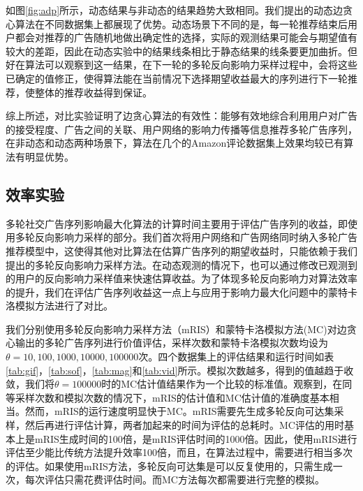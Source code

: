 如图\ref{fig:adp}所示，动态结果与非动态的结果趋势大致相同。我们提出的动态边贪心算法在不同数据集上都展现了优势。动态场景下不同的是，每一轮推荐结束后用户都会对推荐的广告随机地做出确定性的选择，实际的观测结果可能会与期望值有较大的差距，因此在动态实验中的结果线条相比于静态结果的线条要更加曲折。但好在算法可以观察到这一结果，在下一轮的多轮反向影响力采样过程中，会将这些已确定的值修正，使得算法能在当前情况下选择期望收益最大的序列进行下一轮推荐，使整体的推荐收益得到保证。

综上所述，对比实验证明了边贪心算法的有效性：能够有效地综合利用用户对广告的接受程度、广告之间的关联、用户网络的影响力传播等信息推荐多轮广告序列，在非动态和动态两种场景下，算法在几个的Amazon评论数据集上效果均较已有算法有明显优势。

\subsection{效率实验}

多轮社交广告序列影响最大化算法的计算时间主要用于评估广告序列的收益，即使用多轮反向影响力采样的部分。我们首次将用户网络和广告网络同时纳入多轮广告推荐模型中，这使得其他对比算法在估算广告序列的期望收益时，只能依赖于我们提出的多轮反向影响力采样方法。在动态观测的情况下，也可以通过修改已观测到的用户的反向影响力采样值来快速估算收益。为了体现多轮反向影响力对算法效率的提升，我们在评估广告序列收益这一点上与应用于影响力最大化问题中的蒙特卡洛模拟方法\cite{kempe2003maximizing}进行了对比。

我们分别使用多轮反向影响力采样方法（mRIS）和蒙特卡洛模拟方法(MC)对边贪心输出的多轮广告序列进行价值评估，采样次数和蒙特卡洛模拟次数均设为$\theta={10,100,1000,10000,100000}$次。四个数据集上的评估结果和运行时间如表\ref{tab:gif}，\ref{tab:sof}，\ref{tab:mag}和\ref{tab:vid}所示。模拟次数越多，得到的值越趋于收敛，我们将$\theta=100000$时的MC估计值结果作为一个比较的标准值。观察到，在同等采样次数和模拟次数的情况下，mRIS的估计值和MC估计值的准确度基本相当。然而，mRIS的运行速度明显快于MC。mRIS需要先生成多轮反向可达集采样，然后再进行评估计算，两者加起来的时间为评估的总耗时。MC评估的用时基本上是mRIS生成时间的100倍，是mRIS评估时间的1000倍。因此，使用mRIS进行评估至少能比传统方法提升效率100倍，而且，在算法过程中，需要进行相当多次的评估。如果使用mRIS方法，多轮反向可达集是可以反复使用的，只需生成一次，每次评估只需花费评估时间。而MC方法每次都需要进行完整的模拟。


